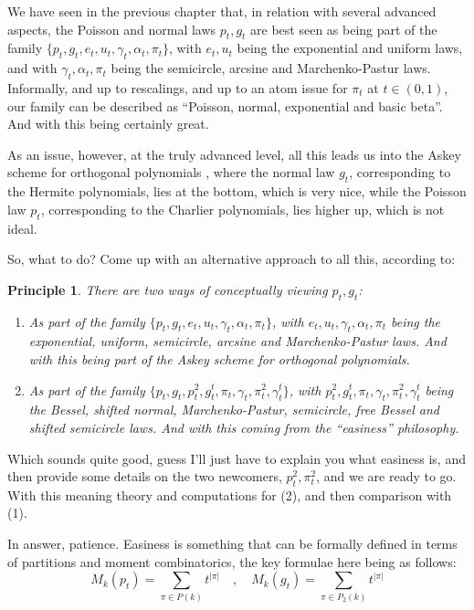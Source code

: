 \documentclass[12pt]{amsbook}
\newtheorem{principle}[theorem]{Principle}
\begin{document}
We have seen in the previous chapter that, in relation with several advanced aspects, the Poisson and normal laws $p_t,g_t$ are best seen as being part of the family $\{p_t,g_t,e_t,u_t,\gamma_t,\alpha_t,\pi_t\}$, with $e_t,u_t$ being the exponential and uniform laws, and with $\gamma_t,\alpha_t,\pi_t$ being the semicircle, arcsine and Marchenko-Pastur laws. Informally, and up to rescalings, and up to an atom issue for $\pi_t$ at $t\in(0,1)$, our family can be described as ``Poisson, normal, exponential and basic beta''. And with this being certainly great.

\bigskip

As an issue, however, at the truly advanced level, all this leads us into the Askey scheme for orthogonal polynomials \cite{awi}, where the normal law $g_t$, corresponding to the Hermite polynomials, lies at the bottom, which is very nice, while the Poisson law $p_t$, corresponding to the Charlier polynomials, lies higher up, which is not ideal. 

\bigskip

So, what to do? Come up with an alternative approach to all this, according to:

\begin{principle}
There are two ways of conceptually viewing $p_t,g_t$:
\begin{enumerate}
\item As part of the family $\{p_t,g_t,e_t,u_t,\gamma_t,\alpha_t,\pi_t\}$, with $e_t,u_t,\gamma_t,\alpha_t,\pi_t$ being the exponential, uniform, semicircle, arcsine and Marchenko-Pastur laws. And with this being part of the Askey scheme for orthogonal polynomials.

\item As part of the family $\{p_t,g_t,p^2_t,g_t^t,\pi_t,\gamma_t,\pi^2_t,\gamma_t^t\}$, with $p^2_t,g_t^t,\pi_t,\gamma_t,\pi^2_t,\gamma_t^t$ being the Bessel, shifted normal, Marchenko-Pastur, semicircle, free Bessel and shifted semicircle laws. And with this coming from the ``easiness'' philosophy.
\end{enumerate}
\end{principle}

Which sounds quite good, guess I'll just have to explain you what easiness is, and then provide some details on the two newcomers, $p^2_t,\pi^2_t$, and we are ready to go. With this meaning theory and computations for (2), and then comparison with (1).

\bigskip

In answer, patience. Easiness is something that can be formally defined in terms of partitions and moment combinatorics, the key formulae here being as follows:
$$M_k(p_t)=\sum_{\pi\in P(k)}t^{|\pi|}\quad,\quad M_k(g_t)=\sum_{\pi\in P_2(k)}t^{|\pi|}$$ 
\end{document}

